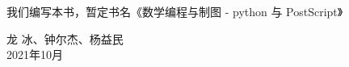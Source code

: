 \documentclass[main.tex]{subfiles}
\begin{document}
我们编写本书，暂定书名《数学编程与制图 - python 与 PostScript》


\begin{flushright}
龙 冰、钟尔杰、杨益民\\
2021年10月
\end{flushright}
\end{document}
